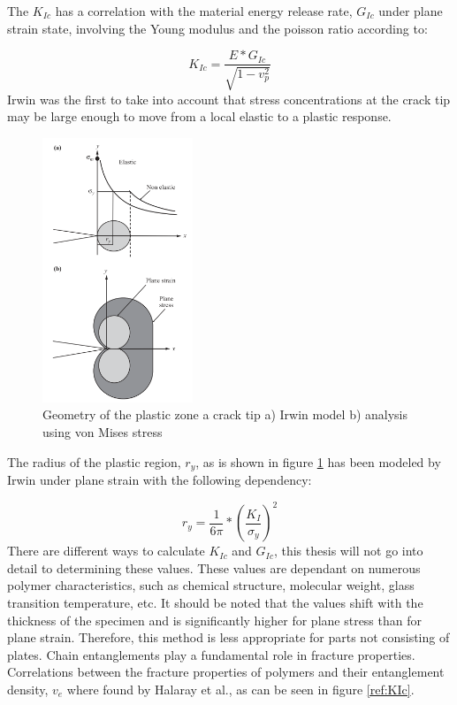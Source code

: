 The  $K_{Ic}$ has a correlation with the material energy release rate, $G_{Ic}$ under plane strain state, involving the Young modulus and the poisson ratio according to: 

\begin{equation} \label{eqn:crazecriterion}
K_{Ic}=\frac{E*G_{Ic}}{\sqrt{1-v^2_p}}
\end{equation}
Irwin was the first to take into account that stress concentrations at the crack tip may be large enough to move from a local elastic to a plastic response. 

\begin{figure}[H]
    \centering
    \includegraphics[width=0.4\textwidth]{chapter_2/figures/Crackstress.png}
    \caption{Geometry of the plastic zone a crack tip a) Irwin model b) analysis using von Mises stress\cite{Halary2011PolymerMaterials}}
    \label{fig:stresscrack}
\end{figure}
The radius of the plastic region, $r_y$, as is shown in figure \ref{fig:stresscrack} has been modeled by Irwin under plane strain with the following dependency:

\begin{equation} \label{eqn:cracktip}
r_y=\frac{1}{6\pi}*\left(\frac{K_I}{\sigma_y}\right)^2
\end{equation}There are different ways to calculate $K_{Ic}$ and  $G_{Ic}$, this thesis will not go into detail to determining these values. These values are dependant on numerous polymer characteristics, such as chemical structure, molecular weight, glass transition temperature, etc. It should be noted that the values shift with the thickness of the specimen and is significantly higher for plane stress than for plane strain. Therefore, this method is less appropriate for parts not consisting of plates. 
Chain entanglements play a fundamental role in fracture properties. Correlations between the fracture properties of polymers and their entanglement density, $v_e$ where found by Halaray et al., as can be seen in figure \ref{ref:KIc}.  

